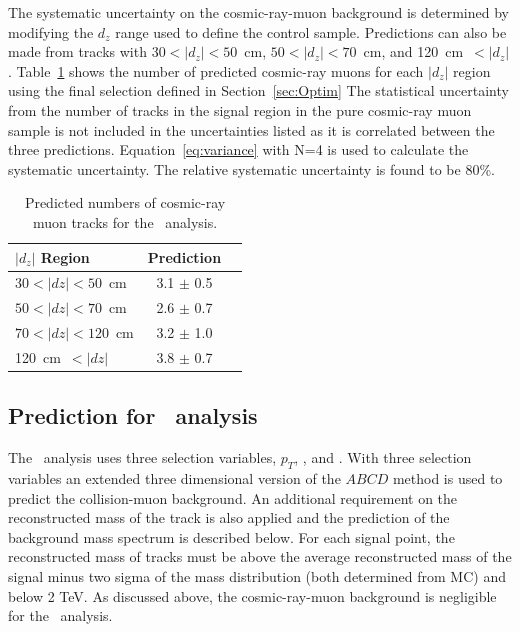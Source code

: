 The systematic uncertainty on the cosmic-ray-muon background is determined by
modifying the $d_z$ range used to define the control sample.  Predictions
can also be made from tracks with $30 < |d_z| < 50$~cm, $50 < |d_z| < 70$~cm, and
120~cm~$< |d_z|$.  Table~\ref{tab:CosmicPred} shows the number of predicted cosmic-ray muons
for each $|d_z|$ region using the final selection defined in Section~\ref{sec:Optim}
The statistical uncertainty from the number of tracks in the signal region in the
pure cosmic-ray muon sample is not included in the uncertainties listed as it is correlated
between the three predictions.
Equation~\ref{eq:variance} with N=4 is used to calculate the systematic uncertainty.
The relative systematic uncertainty is found to be 80\%.

\begin{table}
 \begin{center}
  \caption{Predicted numbers of cosmic-ray muon tracks for the \muononly\ analysis.}
     \label{tab:CosmicPred}
  \begin{tabular}{|l|c|c|} \hline
   $|d_z|$ Region            & Prediction  \\ \hline
   $30 < |dz| < 50$~cm  & 3.1 $\pm$ 0.5   \\ \hline
   $50 < |dz| < 70$~cm  & 2.6 $\pm$ 0.7   \\ \hline
   $70 < |dz| < 120$~cm & 3.2 $\pm$ 1.0   \\ \hline
   120~cm~$< |dz|$      & 3.8 $\pm$ 0.7   \\ \hline
  \end{tabular}
 \end{center}
\end{table}

\subsection{Prediction for \tktof\ analysis}

The \tktof\ analysis uses three selection variables, $p_T$, \invbeta, and \ias. With three selection variables an extended three dimensional version of the 
$ABCD$ method is used to predict the collision-muon background. An additional requirement on the reconstructed mass of the track
is also applied and the prediction of the background mass spectrum is described below. 
For each signal point, the reconstructed mass of tracks must be above the average reconstructed mass of the signal minus two sigma of the mass
distribution (both determined from MC) and below 2 TeV.
As discussed above, the cosmic-ray-muon background is negligible
for the \tktof\ analysis. 

